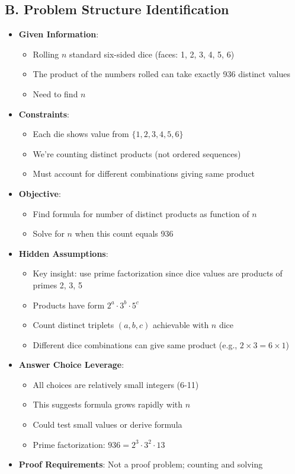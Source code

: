 \documentclass[12pt]{article}
\begin{document}
\begin{problemconfigbox}
\subsection*{B. Problem Structure Identification}
\begin{itemize}[leftmargin=*]
    \item \textbf{Given Information}: 
    \begin{itemize}
        \item Rolling $n$ standard six-sided dice (faces: 1, 2, 3, 4, 5, 6)
        \item The product of the numbers rolled can take exactly 936 distinct values
        \item Need to find $n$
    \end{itemize}
    \item \textbf{Constraints}: 
    \begin{itemize}
        \item Each die shows value from $\{1, 2, 3, 4, 5, 6\}$
        \item We're counting distinct products (not ordered sequences)
        \item Must account for different combinations giving same product
    \end{itemize}
    \item \textbf{Objective}: 
    \begin{itemize}
        \item Find formula for number of distinct products as function of $n$
        \item Solve for $n$ when this count equals 936
    \end{itemize}
    \item \textbf{Hidden Assumptions}: 
    \begin{itemize}
        \item Key insight: use prime factorization since dice values are products of primes 2, 3, 5
        \item Products have form $2^a \cdot 3^b \cdot 5^c$
        \item Count distinct triplets $(a, b, c)$ achievable with $n$ dice
        \item Different dice combinations can give same product (e.g., $2 \times 3 = 6 \times 1$)
    \end{itemize}
    \item \textbf{Answer Choice Leverage}: 
    \begin{itemize}
        \item All choices are relatively small integers (6-11)
        \item This suggests formula grows rapidly with $n$
        \item Could test small values or derive formula
        \item Prime factorization: $936 = 2^3 \cdot 3^2 \cdot 13$
    \end{itemize}
    \item \textbf{Proof Requirements}: Not a proof problem; counting and solving
\end{itemize}


\end{problemconfigbox}
\end{document}
